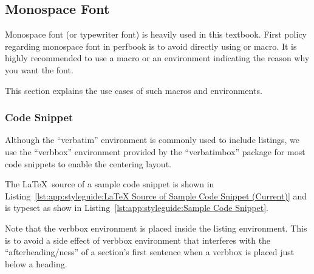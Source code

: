 \subsection{Monospace Font}
\label{sec:app:styleguide:Monospace Font}

Monospace font (or typewriter font) is heavily used in this textbook.
First policy regarding monospace font in perfbook is to avoid
directly using \qco{\\texttt} or \qco{\\tt} macro.
It is highly recommended to use a macro or an environment
indicating the reason why you want the font.

This section explains the use cases of such macros and environments.

\subsubsection{Code Snippet}
\label{sec:app:styleguide:Code Snippet}

Although the ``verbatim'' environment is commonly used to include
listings, we use the ``verbbox'' environment provided by the
``verbatimbox'' package for most code snippets to enable the
centering layout.


\begin{listing}[tbh]
{ \scriptsize
{}
}
\centering
\theverbbox
\caption{\LaTeX\ Source of Sample Code Snippet (Current)}
\label{lst:app:styleguide:LaTeX Source of Sample Code Snippet (Current)}
\end{listing}



The \LaTeX\ source of a sample code snippet is shown in
Listing~\ref{lst:app:styleguide:LaTeX Source of Sample Code Snippet (Current)}
and is typeset as show in
Listing~\ref{lst:app:styleguide:Sample Code Snippet}.

Note that the verbbox environment is placed inside the listing environment.
This is to avoid a side effect of verbbox environment that interferes
with the ``afterheading\-/ness'' of a section's first sentence
when a verbbox is placed just below a heading.

